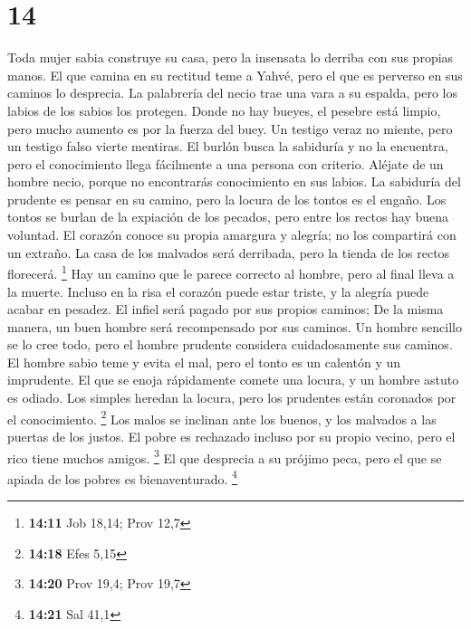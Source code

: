 \hypertarget{section-13}{%
\section{14}\label{section-13}}

 Toda mujer sabia construye su casa, pero la insensata lo
derriba con sus propias manos.  El que camina en su
rectitud teme a Yahvé, pero el que es perverso en sus caminos lo
desprecia.  La palabrería del necio trae una vara a su
espalda, pero los labios de los sabios los protegen. 
Donde no hay bueyes, el pesebre está limpio, pero mucho aumento es por
la fuerza del buey.  Un testigo veraz no miente, pero un
testigo falso vierte mentiras.  El burlón busca la
sabiduría y no la encuentra, pero el conocimiento llega fácilmente a una
persona con criterio.  Aléjate de un hombre necio, porque
no encontrarás conocimiento en sus labios.  La sabiduría
del prudente es pensar en su camino, pero la locura de los tontos es el
engaño.  Los tontos se burlan de la expiación de los
pecados, pero entre los rectos hay buena voluntad.  El
corazón conoce su propia amargura y alegría; no los compartirá con un
extraño.  La casa de los malvados será derribada, pero la
tienda de los rectos florecerá. \footnote{\textbf{14:11} Job 18,14; Prov
  12,7}  Hay un camino que le parece correcto al hombre,
pero al final lleva a la muerte.  Incluso en la risa el
corazón puede estar triste, y la alegría puede acabar en pesadez.
 El infiel será pagado por sus propios caminos; De la
misma manera, un buen hombre será recompensado por sus caminos.
 Un hombre sencillo se lo cree todo, pero el hombre
prudente considera cuidadosamente sus caminos.  El hombre
sabio teme y evita el mal, pero el tonto es un calentón y un imprudente.
 El que se enoja rápidamente comete una locura, y un
hombre astuto es odiado.  Los simples heredan la locura,
pero los prudentes están coronados por el conocimiento. \footnote{\textbf{14:18}
  Efes 5,15}  Los malos se inclinan ante los buenos, y
los malvados a las puertas de los justos.  El pobre es
rechazado incluso por su propio vecino, pero el rico tiene muchos
amigos. \footnote{\textbf{14:20} Prov 19,4; Prov 19,7} 
El que desprecia a su prójimo peca, pero el que se apiada de los pobres
es bienaventurado. \footnote{\textbf{14:21} Sal 41,1} 
